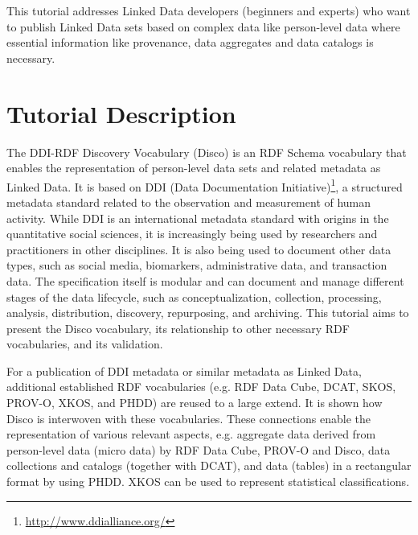 \documentclass{llncs}
\begin{document}
This tutorial addresses Linked Data developers (beginners and experts) who want to publish Linked Data sets based on complex data like person-level data where essential information like provenance, data aggregates and data catalogs is necessary.

\section{Tutorial Description}

The DDI-RDF Discovery Vocabulary (Disco)\cite{Bosch2012,Bosch2013} is an RDF Schema vocabulary that enables the representation of person-level data sets and related metadata as Linked Data.
It is based on DDI (Data Documentation Initiative)\footnote{\url{http://www.ddialliance.org/}}, a structured metadata standard related to the observation and measurement of human activity.
While DDI is an international metadata standard with origins in the quantitative social sciences, it is increasingly being used by researchers and practitioners in other disciplines. It is also being used to document other data types, such as social media, biomarkers, administrative data, and transaction data. The specification itself is modular and can document and manage different stages of the data lifecycle, such as conceptualization, collection, processing, analysis, distribution, discovery, repurposing, and archiving.
This tutorial aims to present the Disco vocabulary, its relationship to other necessary RDF vocabularies, and its validation.
 
For a publication of DDI metadata or similar metadata as Linked Data, additional established RDF vocabularies (e.g. RDF Data Cube, DCAT, SKOS, PROV-O, XKOS, and PHDD) are reused to a large extend. It is shown how Disco is interwoven with these vocabularies. 
These connections enable the representation of various relevant aspects, e.g. aggregate data derived from person-level data (micro data) by RDF Data Cube, PROV-O and Disco, data collections and catalogs (together with DCAT), and data (tables) in a rectangular format by using PHDD. XKOS can be used to represent statistical classifications.
\end{document}
